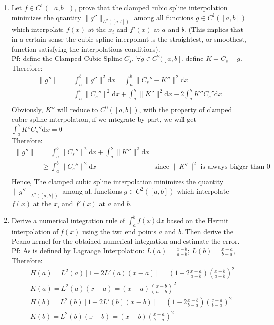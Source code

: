 \documentclass[12pt]{article}
\begin{document}
\begin{enumerate}
\item Let $f \in C^1([a,b])$, prove that the clamped cubic spline interpolation minimizes the quantity $\| g'' \|_{L^2([a,b])}$ among all functions $g \in C^2([a,b])$ which interpolate $f(x)$ at the $x_i$ and $f'(x)$ at $a$ and $b$.  (This implies that in a certain sense the cubic spline interpolant is the straightest, or smoothest, function satisfying the interpolations conditions).\\
Pf: define the Clamped Cubic Spline $C_s$, $\forall g \in C^2([a,b]$, define $K=C_s-g$. Therefore:
\begin{align*}
\| g'' \|&=\int_a^b \| g'' \|^2 \mathrm{d}x= \int_a^b \| C_s''- K''\|^2 \mathrm{d}x\\
& = \int_a^b \| C_s''\|^2 \mathrm{d}x + \int_a^b \|K''\|^2 \mathrm{d}x - 2 \int_a^b K''C_s'' \mathrm{d}x\\
\end{align*}
Obviously, $K''$ will reduce to $C^0([a,b])$, with the property of clamped cubic spline interpolation, if we integrate by part, we will get $\int_a^b K''C_s'' \mathrm{d}x=0$\\
Therefore:
\begin{align*}
\| g'' \| &= \int_a^b \| C_s''\|^2 \mathrm{d}x+ \int_a^b \|K''\|^2 \mathrm{d}x\\
& \geq \int_a^b \| C_s''\|^2 \mathrm{d}x &\mbox{since $\|K''\|^2$ is always bigger than 0}\\
\end{align*}
Hence, The clamped cubic spline interpolation minimizes the quantity $\| g'' \|_{L^2([a,b])}$ among all functions $g \in C^2([a,b])$ which interpolate $f(x)$ at the $x_i$ and $f'(x)$ at $a$ and $b$.
\
\item Derive a numerical integration rule of $\int_{a}^b f(x) \mathrm{d}x$ based on the Hermit interpolation of $f(x)$ using the two end points $a$ and $b$.  Then derive the Peano kernel for the obtained numerical integration and estimate the error.\\
Pf: As is defined by Lagrange Interpolation: $L(a)=\frac{x-b}{a-b}$; $L(b)=\frac{x-a}{b-a}$, Therefore:
\begin{align*}
& H(a)=L^{2}(a)[1-2L'(a)(x-a)]=(1-2\frac{x-a}{a-b})(\frac{x-b}{a-b})^{2}\\
& K(a)=L^{2}(a)(x-a)=(x-a)(\frac{x-b}{a-b})^{2}\\
& H(b)=L^{2}(b)[1-2L'(b)(x-b)]=(1-2\frac{x-b}{b-a})(\frac{x-a}{b-a})^{2}\\
& K(b)=L^{2}(b)(x-b)=(x-b)(\frac{x-a}{b-a})^{2}\\

\end{align*}
\end{enumerate}
\end{document}
